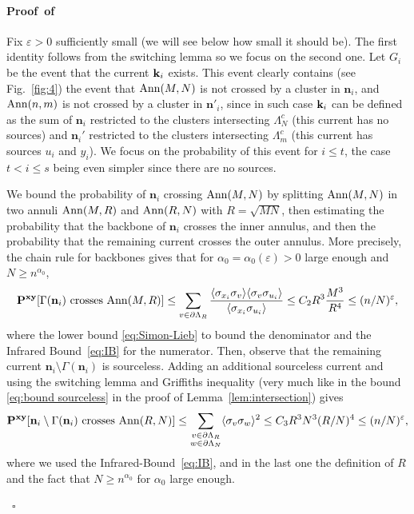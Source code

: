 \documentclass[a4paper,oneside,11pt]{article}
\newcommand{\be}[1]{\begin{equation}\label{#1}}
\newcommand{\ee}{\end{equation}}
\numberwithin{equation}{section}
\numberwithin{equation}{section}
\numberwithin{equation}{section}
\newenvironment{proof}[1][\relax]%
  {\paragraph{Proof\ifx#1\relax\else~of #1\fi}}%
  {~\hfill$\square$\par\bigskip}
\def\be{\begin{equation}}
\def\ee{\end{equation}}
\newcommand{\ep}{\varepsilon}
\newcommand{\n}{\mathbf{n}}
\begin{document}
\begin{proof} Fix $\ep>0$ sufficiently small (we will see below how small it should be). The first identity follows from the switching lemma so we focus on the second one. Let $G_i$ be the event that the current ${\bf k}_i$ exists. This event clearly contains (see Fig.~\ref{fig:4}) the event that ${\rm Ann}(M,N)$ is not crossed by a cluster in $\n_i$, and ${\rm Ann}(n,m)$ is not crossed by a cluster in $\n'_i$, since in such case ${\bf k}_i$ can be defined as the sum of $\n_i$ restricted to the clusters intersecting $\Lambda_N^c$ (this current has no sources) and $\n_i'$ restricted to the clusters intersecting $\Lambda_m^c$ (this current has sources $u_i$ and $y_i$). We focus on the probability of this event for $i\le t$, the case $t<i\le s$ being even simpler since there are no sources.

We  bound the probability of $\n_i$ crossing ${\rm Ann}(M,N)$  by splitting ${\rm Ann}(M,N)$ in two annuli ${\rm Ann}(M,R)$ and ${\rm Ann}(R,N)$ with $R=\sqrt{MN}$, then estimating the probability that the backbone of $\n_i$ crosses the inner annulus, and then the probability that the remaining current crosses the outer annulus. More precisely, the chain rule for backbones \cite{AizBarFer87} gives that for $\alpha_0=\alpha_0(\ep)>0$ large enough and $N\ge n^{\alpha_0}$, 
\be\label{eq:aahaha1}
{\bf P}^{\bf xy}[\Gamma(\n_i)\text{ crosses }{\rm Ann}(M,R)]\le \sum_{v\in \partial\Lambda_{R}}\frac{\langle\sigma_{x_i}\sigma_v\rangle\langle\sigma_v\sigma_{u_i}\rangle}{\langle\sigma_{x_i}\sigma_{u_i}\rangle}\le C_2R^3 \frac{M^3}{R^4}\le (n/N)^\ep,
\ee
where  the lower bound \eqref{eq:Simon-Lieb} to bound the denominator and the Infrared Bound~\eqref{eq:IB} for the numerator. 
Then, observe that the remaining current $\n_i\setminus\Gamma(\n_i)$ is sourceless. Adding an additional sourceless current  and using the switching lemma and Griffiths inequality \cite{Gri67} 
(very much like in the bound \eqref{eq:bound sourceless} in the proof of Lemma~\ref{lem:intersection}) gives
\be\label{eq:aahaha}
{\bf P}^{\bf xy}[\n_i\setminus\Gamma(\n_i)\text{ crosses }{\rm Ann}(R,N)]\le\sum_{\substack{v\in \partial\Lambda_R\\ w\in\partial\Lambda_N}}\langle\sigma_v\sigma_w\rangle^2\le C_3R^3N^3(R/N)^4\le (n/N)^\ep,
\ee
where we used the Infrared-Bound~\ref{eq:IB}, and in the last one the definition of $R$ and the fact that $N\ge n^{\alpha_0}$ for $\alpha_0$ large enough.


\end{proof}
\end{document}
